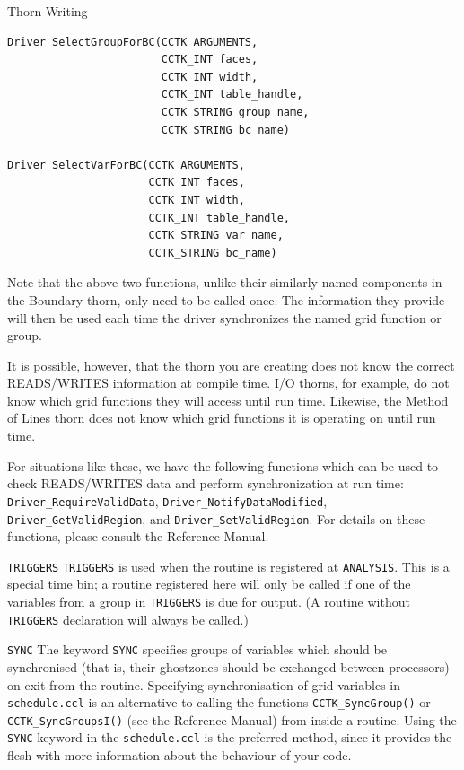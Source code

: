 \begin{cactuspart}{Thorn Writing}
\begin{Lentry}
\begin{verbatim}
Driver_SelectGroupForBC(CCTK_ARGUMENTS,
                        CCTK_INT faces,
                        CCTK_INT width,
                        CCTK_INT table_handle,
                        CCTK_STRING group_name,
                        CCTK_STRING bc_name)

Driver_SelectVarForBC(CCTK_ARGUMENTS,
                      CCTK_INT faces,
                      CCTK_INT width,
                      CCTK_INT table_handle,
                      CCTK_STRING var_name,
                      CCTK_STRING bc_name)
\end{verbatim}

Note that the above two functions, unlike their similarly named components in the Boundary thorn, only need to be called once. The information they provide will then be used each time the driver synchronizes the named grid function or group.

It is possible, however, that the thorn you are creating does not know the correct READS/WRITES information at compile time. I/O thorns, for
example, do not know which grid functions they will access until run time. Likewise, the Method of Lines thorn does not know which grid functions it is operating on until run time.

For situations like these, we have the following functions which can be used to check READS/WRITES data and perform synchronization at run time:
\texttt{Driver\_RequireValidData}, \texttt{Driver\_NotifyDataModified}, \texttt{Driver\_GetValidRegion}, and \texttt{Driver\_SetValidRegion}. For details on these functions, please consult the Reference Manual.

\item[\texttt{TRIGGERS}] \texttt{TRIGGERS} is used when the routine is
registered at \texttt{ANALYSIS}.  This is a special time bin; a routine
registered here will only be called if one of the variables from a
group in \texttt{TRIGGERS} is due for output.  (A routine without {\tt
TRIGGERS} declaration will always be called.)

\item[\texttt{SYNC}]
The keyword \texttt{SYNC} specifies groups of variables which should be
synchronised (that is, their ghostzones should be exchanged between
processors) on exit from the routine. Specifying synchronisation of
grid variables in \texttt{schedule.ccl} is an alternative to calling the
functions \texttt{CCTK\_SyncGroup()} or \texttt{CCTK\_SyncGroupsI()}
(see the Reference Manual) from inside a routine. Using the \texttt{SYNC}
keyword in the \texttt{schedule.ccl} is the preferred method, since it
provides the flesh with more information about the behaviour of your code.


\end{Lentry}
\end{cactuspart}
